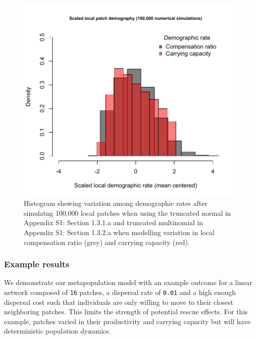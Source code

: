 \documentclass[
]{article}
\begin{document}
\begin{figure}[H]

{\centering \includegraphics{Managing_for_ecological_surprises_in_metapopulations_files/figure-latex/histogram of demographic variation-1} 

}

\caption{Histogram showing variation among demographic rates after simulatng 100,000 local patches when using the truncated normal in Appendix S1: Section 1.3.1.a and truncated multinomial in Appendix S1: Section 1.3.2.a when modelling variation in local compensation ratio (grey) and carrying capacity (red).}\label{fig:histogram of demographic variation}
\end{figure}

\hypertarget{example-results}{%
\subsubsection{Example results}\label{example-results}}

We demonstrate our metapopulation model with an example outcome for a
linear network composed of \texttt{16} patches, a dispersal rate of
\texttt{0.01} and a high enough dispersal cost such that individuals are
only willing to move to their closest neighboring patches. This limits
the strength of potential rescue effects. For this example, patches
varied in their productivity and carrying capacity but will have
deterministic population dynamics.
\end{document}
